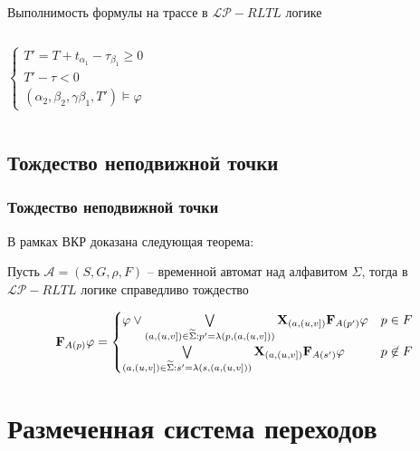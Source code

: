 \documentclass{beamer}
\begin{document}
\begin{frame}{Выполнимость формулы на трассе в $\mathcal{LP}-RLTL$ логике}
\begin{columns}[t,onlytextwidth]
\begin{itemize}
\begin{equation*}
\begin{cases}
        T' = T + t_{\alpha_1} - \tau_{\beta_1} \geq 0 \\
        
        T' - \tau < 0 \\
    
        (\alpha_2, \beta_2, \gamma\beta_1, T') \models \varphi

        \end{cases}
    \end{equation*}
\end{itemize}

\end{columns}


\end{frame}


\subsection{Тождество неподвижной точки}

\begin{frame}
\frametitle{Тождество неподвижной точки}

В рамках ВКР доказана следующая теорема:
\begin{theorem}

Пусть $\mathcal{A} = (S, G, \rho, F)$ -- временной автомат над алфавитом $\Sigma$, тогда в $\mathcal{LP}-RLTL$ логике справедливо тождество

\begin{equation*}
\mathbf{F}_{A(p)}\varphi = 
 \begin{cases}
   \text{$\varphi \vee \bigvee\limits_{(a, (u, v]) \in \widetilde{\Sigma}: p' = \lambda(p, (a, (u, v]))} \mathbf{X}_{(a, (u, v])}\mathbf{F}_{A(p')}\varphi $} & \text{$ p \in F $} \\
   
   \text{$\bigvee\limits_{(a, (u, v]) \in \widetilde{\Sigma}: s' = \lambda(s, (a, (u, v]))} \mathbf{X}_{(a, (u, v])}\mathbf{F}_{A(s')}\varphi $} & \text{$ p \not\in F $}
 \end{cases}
\end{equation*}

\end{theorem}

\end{frame}

\section{Размеченная система переходов}
 
\end{document}
